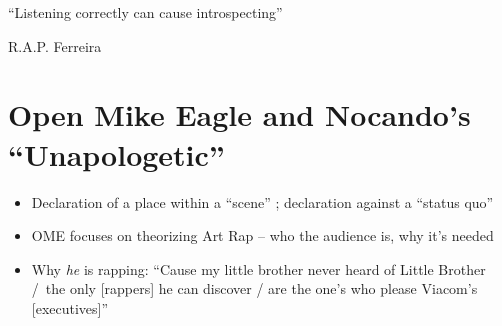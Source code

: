 
\epigraph{{``Listening correctly can cause introspecting''}}{R.A.P. Ferreira}

\section{Open Mike Eagle and Nocando's ``Unapologetic''}

\begin{itemize}
    \item Declaration of a place within a ``scene'' ; declaration against a ``status quo''
    \item OME focuses on theorizing Art Rap -- who the audience is, why it's needed
    \item Why \emph{he} is rapping: ``Cause my little brother never heard of Little Brother 
    /\textellipsis~the only [rappers] he can discover / are the one's who please Viacom's [executives]''
\end{itemize}

